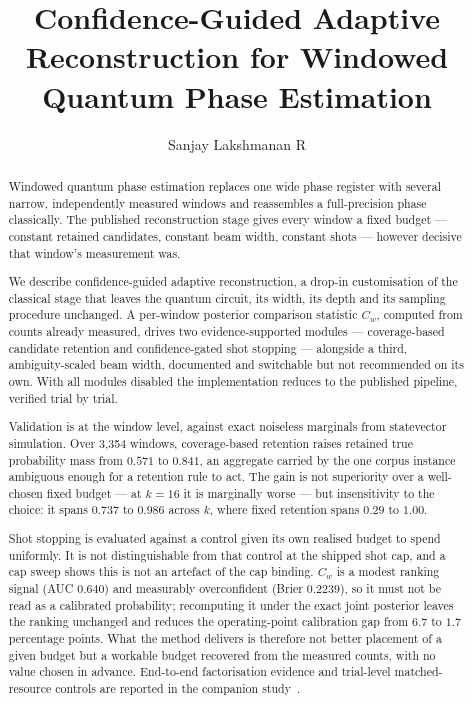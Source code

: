 \documentclass[final,5p,times,longtitle]{elsarticle}
\newcommand{\Cw}{C_w}
\begin{document}
\begin{frontmatter}

\title{Confidence-Guided Adaptive Reconstruction for Windowed Quantum
Phase Estimation}

\author[inst1]{Sanjay Lakshmanan R}

\address[inst1]{Department of Computer Science and Engineering,
Amrita Vishwa Vidyapeetham, Chennai, India}

\begin{abstract}
Windowed quantum phase estimation replaces one wide phase register with
several narrow, independently measured windows and reassembles a
full-precision phase classically. The published reconstruction stage gives
every window a fixed budget --- constant retained candidates, constant beam
width, constant shots --- however decisive that window's measurement was.

We describe confidence-guided adaptive reconstruction, a drop-in
customisation of the classical stage that leaves the quantum circuit, its
width, its depth and its sampling procedure unchanged. A per-window
posterior comparison statistic $\Cw$, computed from counts already
measured, drives two evidence-supported modules --- coverage-based
candidate retention and confidence-gated shot stopping --- alongside a
third, ambiguity-scaled beam width, documented and switchable but not
recommended on its own. With all modules disabled the implementation
reduces to the published pipeline, verified trial by trial.

Validation is at the window level, against exact noiseless marginals from
statevector simulation. Over 3{,}354 windows, coverage-based retention
raises retained true probability mass from $0.571$ to $0.841$, an aggregate
carried by the one corpus instance ambiguous enough for a retention rule to
act. The gain is not superiority over a well-chosen fixed budget --- at
$k=16$ it is marginally worse --- but insensitivity to the choice: it spans
$0.737$ to $0.986$ across $k$, where fixed retention spans $0.29$ to
$1.00$.

Shot stopping is evaluated against a control given its own realised budget
to spend uniformly. It is not distinguishable from that control at the
shipped shot cap, and a cap sweep shows this is not an artefact of the cap
binding. $\Cw$ is a modest ranking signal (AUC $0.640$) and measurably
overconfident (Brier $0.2239$), so it must not be read as a calibrated
probability; recomputing it under the exact joint posterior leaves the
ranking unchanged and reduces the operating-point calibration gap from
$6.7$ to $1.7$ percentage points. What the method delivers is therefore not
better placement of a given budget but a workable budget recovered from the
measured counts, with no value chosen in advance. End-to-end factorisation
evidence and trial-level matched-resource controls are reported in the
companion study~\cite{companion}.
\end{abstract}


\end{frontmatter}
\end{document}

